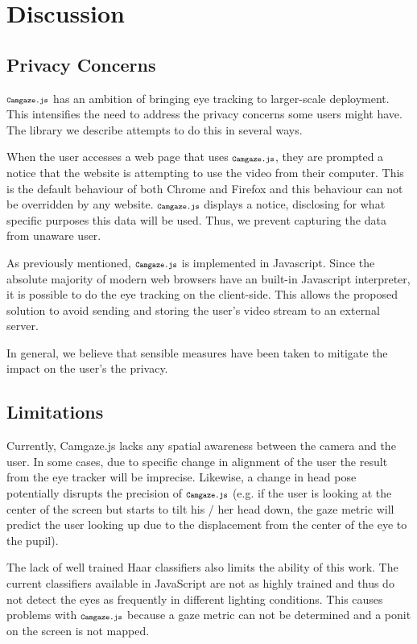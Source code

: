 \documentclass[annual]{acmsiggraph}
\newcommand{\Acronym}[1]{\ensuremath{{\small{\texttt{#1}}}}}
\newcommand{\Name}{\Acronym{Camgaze.js}} \newcommand{\False}{\Constant{false}}
\newcommand{\Constant}[1]{\ensuremath{\small{\texttt{#1}}}}
\begin{document}
\section{Discussion}

\subsection{Privacy Concerns}

$\Name$ has an ambition of bringing eye tracking to larger-scale deployment.
This intensifies the need to address the privacy concerns some users might
have. The library we describe attempts to do this in several ways.

When the user accesses a web page that uses $\Name$, they are prompted a
notice that the website is attempting to use the video from their computer.
This is the default behaviour of both Chrome and Firefox and this behaviour can
not be overridden by any website. $\Name$ displays a notice, disclosing for
what specific purposes this data will be used. Thus, we prevent capturing the
data from unaware user.

As previously mentioned, $\Name$ is implemented in Javascript. Since the
absolute majority of modern web browsers have an built-in Javascript
interpreter, it is possible to do the eye tracking on the client-side. This
allows the proposed solution to avoid sending and storing the user’s video
stream to an external server.

In general, we believe that sensible measures have been taken to mitigate the
impact on the user’s the privacy.

\subsection{Limitations}

Currently, Camgaze.js lacks any spatial awareness between the camera and the
user. In some cases, due to specific change in alignment of the user the result
from the eye tracker will be imprecise. Likewise, a change in head pose
potentially disrupts the precision of $\Name$ (e.g. if the user is looking at
the center of the screen but starts to tilt his / her head down, the gaze
metric will predict the user looking up due to the displacement from the center
of the eye to the pupil).

The lack of well trained Haar classifiers also limits the ability of this work.
The current classifiers available in JavaScript are not as highly trained and
thus do not detect the eyes as frequently in different lighting conditions.
This causes problems with $\Name$ because a gaze metric can not be determined
and a ponit on the screen is not mapped. 
\end{document}
